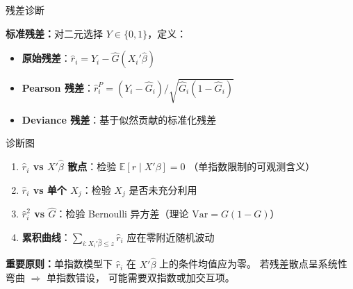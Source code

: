 \documentclass[aspectratio=169, 10pt]{beamer}
\begin{document}
\begin{frame}{残差诊断}

  \textbf{标准残差：}对二元选择 $Y \in \{0, 1\}$，定义：
  \begin{itemize}\setlength{\itemsep}{1pt}
    \item \textbf{原始残差}：$\hat r_i = Y_i - \hat G(X_i'\hat\beta)$
    \item \textbf{Pearson 残差}：$\hat r_i^P = (Y_i - \hat G_i)/\sqrt{\hat G_i (1 - \hat G_i)}$
    \item \textbf{Deviance 残差}：基于似然贡献的标准化残差
  \end{itemize}

  \begin{definitionbox}{{诊断图}}
    \begin{enumerate}\setlength{\itemsep}{1pt}
      \item \textbf{$\hat r_i$ vs $X'\hat\beta$ 散点}：检验 $\mathbb{E}[r\mid X'\beta] = 0$
      （单指数限制的可观测含义）
      \item \textbf{$\hat r_i$ vs 单个 $X_j$}：检验 $X_j$ 是否未充分利用
      \item \textbf{$\hat r_i^2$ vs $\hat G$}：检验 Bernoulli 异方差（理论 $\text{Var} = G(1-G)$）
      \item \textbf{累积曲线}：$\sum_{i: X_i'\hat\beta \leq z} \hat r_i$ 应在零附近随机波动
    \end{enumerate}
  \end{definitionbox}

  \begin{keybox}
    \textbf{重要原则：}单指数模型下 $\hat r_i$ 在 $X'\hat\beta$ 上的条件均值应为零。
    若残差散点呈系统性弯曲 $\Rightarrow$ 单指数错设，
    可能需要双指数或加交互项。
  \end{keybox}

\end{frame}
\end{document}
